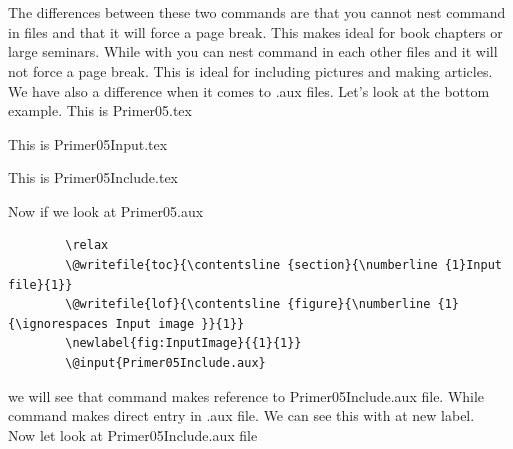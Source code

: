 \documentclass[a4paper,oneside,8pt]{extarticle}
\begin{document}
The differences between these two commands are that you cannot nest \verb|| command in files and that it will force a page break. This makes ideal for book chapters or large seminars. While with \verb|| you can nest command in each other files and it will not force a page break. This is ideal for including pictures and making articles. \\

We have also a difference when it comes to .aux files. Let's look at the bottom example. This is Primer05.tex\\

\begin{markdown-block}
    
\end{markdown-block}

This is Primer05Input.tex\\

\begin{markdown-block}
    
\end{markdown-block}

This is Primer05Include.tex\\
\begin{markdown-block}
    
\end{markdown-block}

Now if we look at Primer05.aux\\
\begin{markdown-block}
    \begin{verbatim}
        \relax 
        \@writefile{toc}{\contentsline {section}{\numberline {1}Input file}{1}}
        \@writefile{lof}{\contentsline {figure}{\numberline {1}{\ignorespaces Input image }}{1}}
        \newlabel{fig:InputImage}{{1}{1}}
        \@input{Primer05Include.aux}
    \end{verbatim}
\end{markdown-block}

we will see that \verb|| command makes reference to Primer05Include.aux file. While \verb|| command makes direct entry in .aux file. We can see this with at new label.\\
Now let look at Primer05Include.aux file
\end{document}
